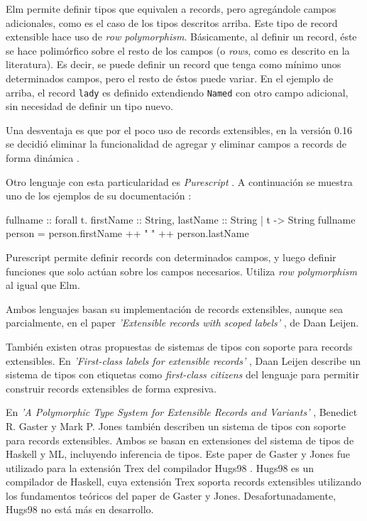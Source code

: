 Elm permite definir tipos que equivalen a records, pero agregándole campos adicionales, como es el caso de los tipos descritos arriba. Este tipo de record extensible hace uso de \textit{row polymorphism}. Básicamente, al definir un record, éste se hace polimórfico sobre el resto de los campos (o \textit{rows}, como es descrito en la literatura). Es decir, se puede definir un record que tenga como mínimo unos determinados campos, pero el resto de éstos puede variar. En el ejemplo de arriba, el record \texttt{lady} es definido extendiendo \texttt{Named} con otro campo adicional, sin necesidad de definir un tipo nuevo.

Una desventaja es que por el poco uso de records extensibles, en la versión 0.16 se decidió eliminar la funcionalidad de agregar y eliminar campos a records de forma dinámica \cite{ElmReducedRecordSyntax}.

Otro lenguaje con esta particularidad es \textit{Purescript} \cite{PurescriptByExample}. A continuación se muestra uno de los ejemplos de su documentación \cite{PurescriptRecords}:

\begin{code}
fullname :: forall t. { firstName :: String,
  lastName :: String | t } -> String
fullname person = person.firstName ++ " " ++ person.lastName
\end{code}

Purescript permite definir records con determinados campos, y luego definir funciones que solo actúan sobre los campos necesarios. Utiliza \textit{row polymorphism} al igual que Elm.

Ambos lenguajes basan su implementación de records extensibles, aunque sea parcialmente, en el paper \textit{'Extensible records with scoped labels'} \cite{Leijen:scopedlabels}, de Daan Leijen.

También existen otras propuestas de sistemas de tipos con soporte para records extensibles. En \textit{'First-class labels for extensible records'} \cite{Leijen:fclabels}, Daan Leijen describe un sistema de tipos con etiquetas como \textit{first-class citizens} del lenguaje para permitir construir records extensibles de forma expresiva. 

En \textit{'A Polymorphic Type System for Extensible Records and Variants'} \cite{Gaster96apolymorphic}, Benedict R. Gaster y Mark P. Jones también describen un sistema de tipos con soporte para records extensibles. Ambos se basan en extensiones del sistema de tipos de Haskell y ML, incluyendo inferencia de tipos. Este paper de Gaster y Jones fue utilizado para la extensión Trex del compilador Hugs98 \cite{TrexHugsExtension}. Hugs98 es un compilador de Haskell, cuya extensión Trex soporta records extensibles utilizando los fundamentos teóricos del paper de Gaster y Jones. Desafortunadamente, Hugs98 no está más en desarrollo.

